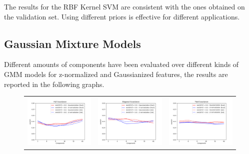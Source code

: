 \documentclass[12pt,a4paper]{article}
\begin{document}
\vspace{15pt}
The results for the RBF Kernel SVM are consistent with the ones obtained on the validation set. Using different priors is effective for different applications.


\subsection{Gaussian Mixture Models}

Different amounts of components have been evaluated over different kinds of GMM models for z-normalized and Gaussianized features, the results are reported in the following graphs.

\begin{figure}[H]
    \begin{center}
        \begin{tabular}{ccc}
            \hspace*{-65pt}
            \includegraphics[width = 160pt]{img/evaluation_plots/evaluation-gmm-full-covariance.png}     &
            \includegraphics[width = 160pt]{img/evaluation_plots/evaluation-gmm-diagonal-covariance.png} &
            \includegraphics[width = 160pt]{img/evaluation_plots/evaluation-gmm-tied-covariance.png}       \\
        \end{tabular}
    \end{center}
\end{figure}
\end{document}
